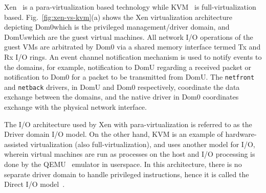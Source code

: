 Xen~\cite{xen-art-of-virtualization} is a 
para-virtualization 
based technology while KVM~\cite{kvm} is 
full-virtualization based.
Fig.~\ref{fig:xen-vs-kvm}(a) shows the Xen 
virtualization architecture depicting 
Dom0\textemdash{}which 
is the privileged management/driver domain, and 
DomUs\textemdash{}which 
are the guest virtual machines. 
All network I/O operations
of the guest VMs are arbitrated by Dom0 via a shared memory interface
termed Tx and Rx I/O rings. 
An event channel notification mechanism is used to notify events
to the domains, for example, notification to DomU regarding a 
received packet or notification to Dom0 for a packet to be
transmitted from DomU.
The \texttt{netfront} 
and \texttt{netback} 
drivers, in DomU and Dom0 respectively,
coordinate the data exchange between the domains,
and the native driver in Dom0 coordinates exchange with
the physical network interface. 

The I/O architecture used by Xen with para-virtualization 
is referred to as the Driver domain I/O model. 
On the other hand, KVM\cite{kvm-whitepaper} 
is an example of hardware-assisted virtualization (also full-virtualization),
and uses another model for I/O, wherein virtual machines are run as 
processes on the host and I/O
processing is done by the QEMU~\cite{qemu} emulator in userspace.
In this architecture, there is no separate driver domain to handle 
privileged instructions, hence it is called 
the Direct I/O model~\cite{net-fairness-visa-2010}.

